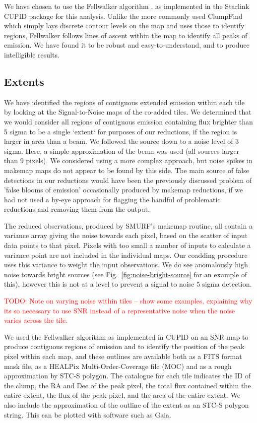 \documentclass[usenatbib]{mnras}
\newcommand{\todo}[1]{\textcolor{red}{TODO: #1}}
\begin{document}
We have chosen to use the Fellwalker algorithm \citep{Berry2015}, as
implemented in the Starlink CUPID \citep{cupid} package for this
analysis. Unlike the more commonly used ClumpFind which simply lays
discrete contour levels on the map and uses those to identify regions,
Fellwalker follows lines of ascent within the map to identify all
peaks of emission. We have found it to be robust and
easy-to-understand, and to produce intelligible results.

\subsection{Extents}

We have identified the regions of contiguous extended emission within
each tile by looking at the Signal-to-Noise maps of the co-added
tiles. We determined that we would consider all regions of contiguous
emission containing flux brighter than 5 sigma to be a single `extent`
for purposes of our reductions, if the region is larger in area than a
beam. We followed the source down to a noise level of 3 sigma.  Here,
a simple approximation of the beam was used (all sources larger than 9
pixels). We considered using a more complex approach, but noise spikes
in makemap maps do not appear to be found by this side. The main
source of false detections in our reductions would have been the
previously discussed problem of 'false blooms of emission'
occasionally produced by makemap reductions, if we had not used a
by-eye approach for flagging the handful of problematic reductions and
removing them from the output.

The reduced observations, produced by SMURF's makemap routine, all
contain a variance array giving the noise towards each pixel, based on
the scatter of input data points to that pixel. Pixels with too small
a number of inputs to calculate a variance point are not included in
the individual maps. Our coadding procedure uses this variance to
weight the input observations. We do see anomalously high noise
towards bright sources (see Fig.~\ref{fig:noise-bright-source} for an
example of this), however this is not at a level to prevent a signal
to noise 5 sigma detection.

\todo{Note on varying noise within tiles -- show some examples,
  explaining why its so necessary to use SNR instead of a
  representative noise when the noise varies across the tile.}

We used the Fellwalker algorithm as implemented in CUPID on an SNR map
to produce contiguous regions of emission and to identify the position
of the peak pixel within each map, and these outlines are available
both as a FITS format mask file, as a HEALPix Multi-Order-Coverage
file (MOC) and as a rough approximation by STC-S polygon. The
catalogue for each tile indicates the ID of the clump, the RA and Dec
of the peak pixel, the total flux contained within the entire extent,
the flux of the peak pixel, and the area of the entire extent. We also
include the approximation of the outline of the extent as an STC-S
polygon string. This can be plotted with software such as Gaia.
\end{document}
